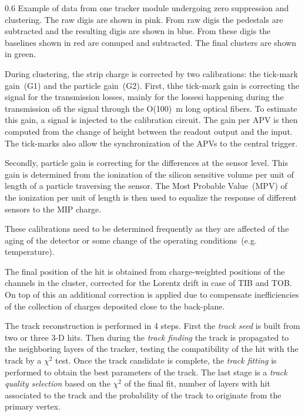                  {0.6}       %
                 {Example of data from one tracker module undergoing zero suppression and clustering. The raw digis are shown in pink. From raw digis the pedestals are subtracted and the resulting digis are shown in blue. From these digis the baselines shown in red are comuped and subtracted. The final clusters are shown in green.} %

During clustering, the strip charge is corrected by two calibrations: the tick-mark gain~(G1) and the particle gain~(G2). First, thhe tick-mark gain is correcting the signal for the transmission losses, mainly for the lossesi happening during the transmission ofi the signal through the O(100)~m long optical fibers. To estimate this gain, a signal is injected to the calibration circuit. The gain per APV is then computed from the change of height between the readout output and the input. The tick-marks also allow the synchronization of the APVs to the central trigger.

Secondly, particle gain is correcting for the differences at the sensor level. This gain is determined from the ionization of the silicon sensitive volume per unit of length of a particle traversing the sensor. The Most Probable Value~(MPV) of the ionization per unit of length is then used to equalize the response of different sensors to the MIP charge. 

These calibrations need to be determined frequently as they are affected of the aging of the detector or some change of the operating conditions~(e.g. temperature).

The final position of the hit is obtained from charge-weighted positions of the channels in the cluster, corrected for the Lorentz drift in case of TIB and TOB. On top of this an additional correction is applied due to compensate inefficiencies of the collection of charges deposited close to the back-plane. 

The track reconstruction is performed in 4 steps. First the \textit{track seed} is built from two or three 3-D hits. Then during the \textit{track finding} the track is propagated to the neighboring layers of the tracker, testing the compatibility of the hit with the track by a $\chi^{2}$ test. Once the track candidate is complete, the \textit{track fitting} is performed to obtain the best parameters of the track. The last stage is a \textit{track quality selection} based on the $\chi^{2}$ of the final fit, number of layers with hit associated to the track and the probability of the track  to originate from the primary vertex.

